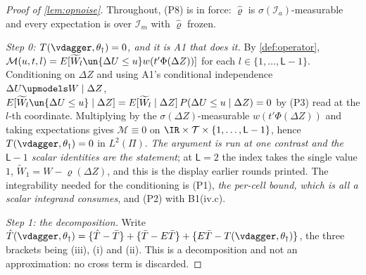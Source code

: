 
\begin{proof}[Proof of \cref{lem:opnoise}]
Throughout, (P8) is in force: $\hat\varrho$ is $\sigma(\mathcal I_a)$-measurable and every expectation
is over $\mathcal I_m$ with $\hat\varrho$ frozen.

\emph{Step 0: $T(\vdagger,\theta_\dagger)=0$, and it is A1 that does it.} By \cref{def:operator},
$\mathcal M(u,t,l)=E[\widetilde W_l\un\{\Delta U\le u\}w(t'\Phi(\Delta Z))]$ for each
$l\in\{1,\dots,\mathsf L-1\}$. Conditioning on $\Delta Z$ and
using A1's conditional independence $\Delta U\upmodels W\mid\Delta Z$,
$E[\widetilde W_l\un\{\Delta U\le u\}\mid\Delta Z]=E[\widetilde W_l\mid\Delta Z]\,P(\Delta U\le u\mid\Delta Z)=0$
by (P3) read at the $l$-th coordinate. Multiplying by the $\sigma(\Delta Z)$-measurable
$w(t'\Phi(\Delta Z))$ and taking expectations
gives $\mathcal M\equiv0$ on $\IR\times\mathcal T\times\{1,\dots,\mathsf L-1\}$, hence
$T(\vdagger,\theta_\dagger)=0$ in $L^{2}(\Pi)$. \emph{The argument is run at one contrast and the
$\mathsf L-1$ scalar identities are the statement}; at $\mathsf L=2$ the index takes the single value
$1$, $\widetilde W_1=W-\varrho(\Delta Z)$, and this is the display earlier rounds printed. The
integrability needed for the conditioning is (P1), \emph{the per-cell bound, which is all a scalar
integrand consumes}, and (P2) with B1(iv.c).

\emph{Step 1: the decomposition.} Write
$\hat T(\vdagger,\theta_\dagger)=\{\hat T-\bar T\}+\{\bar T-E\bar T\}+\{E\bar T-T(\vdagger,\theta_\dagger)\}$,
the three brackets being (iii), (i) and (ii). This is a decomposition and not an approximation:
no cross term is discarded.


\end{proof}

